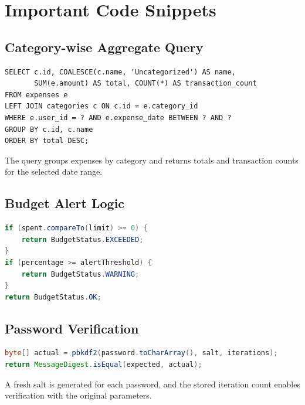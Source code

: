 \documentclass[12pt,a4paper]{report}
\begin{document}
\section{Important Code Snippets}
\subsection{Category-wise Aggregate Query}
\begin{minipage}{\linewidth}
\begin{lstlisting}[caption={Representative SQL aggregation},aboveskip=6pt,belowskip=6pt]
SELECT c.id, COALESCE(c.name, 'Uncategorized') AS name,
       SUM(e.amount) AS total, COUNT(*) AS transaction_count
FROM expenses e
LEFT JOIN categories c ON c.id = e.category_id
WHERE e.user_id = ? AND e.expense_date BETWEEN ? AND ?
GROUP BY c.id, c.name
ORDER BY total DESC;
\end{lstlisting}
\end{minipage}
The query groups expenses by category and returns totals and transaction counts for the selected date range.

\subsection{Budget Alert Logic}
\begin{minipage}{\linewidth}
\begin{lstlisting}[language=Java,caption={Budget threshold decision},aboveskip=6pt,belowskip=6pt]
if (spent.compareTo(limit) >= 0) {
    return BudgetStatus.EXCEEDED;
}
if (percentage >= alertThreshold) {
    return BudgetStatus.WARNING;
}
return BudgetStatus.OK;
\end{lstlisting}
\end{minipage}

\subsection{Password Verification}
\begin{minipage}{\linewidth}
\begin{lstlisting}[language=Java,caption={Secure password verification},aboveskip=6pt,belowskip=6pt]
byte[] actual = pbkdf2(password.toCharArray(), salt, iterations);
return MessageDigest.isEqual(expected, actual);
\end{lstlisting}
\end{minipage}
A fresh salt is generated for each password, and the stored iteration count enables verification with the original parameters.
\end{document}

